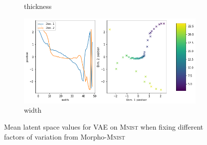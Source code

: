 \begin{figure}[H]
\begin{subfigure}{.48\textwidth}
        \caption{thickness}
    \end{subfigure}
    \begin{subfigure}{.48\textwidth}
        \includegraphics[width=\textwidth]{images/latent_space_traversals/vae_mnist_morpho_latent_space_values_width.png}
        \caption{width}
    \end{subfigure}
    \caption{Mean latent space values for \ac{VAE} on \textsc{Mnist} when fixing different factors of variation from Morpho-\textsc{Mnist}}
    \label{fig:vae_mnist_morpho_latent_space_values}
\end{figure}

